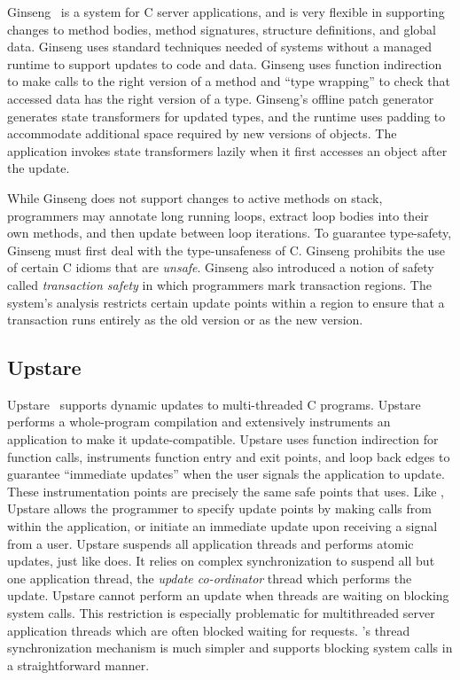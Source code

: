 Ginseng~\cite{neamtiu06dsu, neamtiu-thesis} is a \USD system for
C server applications, and is very flexible in supporting changes to method
bodies, method signatures, structure definitions, and global data.
Ginseng uses standard techniques needed of \USD systems without a managed
runtime to support updates to code and data. Ginseng uses function
indirection to make calls to the right version of a method and ``type
wrapping'' to check that accessed data has the right version of a type.
Ginseng's offline patch generator generates state transformers for updated
types, and the runtime uses padding to accommodate additional space required
by new versions of objects. The application invokes state transformers
lazily when it first accesses an object after the update.

While Ginseng does not support changes to active methods on stack,
programmers may annotate long running loops, extract loop bodies
into their own methods, and then update between loop iterations. To
guarantee type-safety, Ginseng must first deal with the type-unsafeness of
C\@. Ginseng prohibits the use of certain C idioms that are {\em unsafe}.
Ginseng also introduced a notion of safety called
{\em transaction safety} in which programmers mark transaction regions. The
system's analysis restricts certain update points within a region to ensure
that a transaction runs entirely as the old version or as the new version.

\subsection{Upstare}

Upstare~\cite{upstare, upstare-thesis} supports dynamic updates to
multi-threaded C programs. Upstare performs a whole-program compilation and
extensively instruments an application to make it update-compatible.
Upstare uses function indirection for function calls,
instruments function entry and exit points, and loop back edges to
guarantee ``immediate updates'' when the user signals the application to
update. These instrumentation points are precisely the same \VM safe points
that \JV uses. Like \JV, Upstare allows the programmer to specify update
points by making \API calls from within the application, or initiate an
immediate update upon receiving a signal from a user. Upstare suspends all
application threads and performs atomic updates, just like \JV does. It
relies on complex synchronization to suspend all but one application
thread, the {\em update co-ordinator} thread which performs the update.
Upstare cannot perform an update when threads are waiting on
blocking system calls. This restriction is especially problematic for
multithreaded server application threads which are often blocked waiting
for requests. \JV's thread synchronization mechanism is much simpler and
supports blocking system calls in a straightforward manner.

